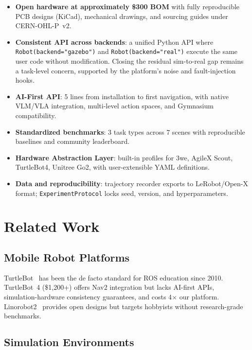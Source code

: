 \documentclass[conference]{IEEEtran}
\begin{document}
\begin{itemize}
    \item \textbf{Open hardware at approximately \$300 BOM} with fully reproducible PCB designs (KiCad), mechanical drawings, and sourcing guides under CERN-OHL-P~v2.
    \item \textbf{Consistent API across backends}: a unified Python API where \texttt{Robot(backend="gazebo")} and \texttt{Robot(backend="real")} execute the same user code without modification. Closing the residual sim-to-real gap remains a task-level concern, supported by the platform's noise and fault-injection hooks.
    \item \textbf{AI-First API}: 5 lines from installation to first navigation, with native VLM/VLA integration, multi-level action spaces, and Gymnasium compatibility.
    \item \textbf{Standardized benchmarks}: 3 task types across 7 scenes with reproducible baselines and community leaderboard.
    \item \textbf{Hardware Abstraction Layer}: built-in profiles for 3we, AgileX Scout, TurtleBot4, Unitree Go2, with user-extensible YAML definitions.
    \item \textbf{Data and reproducibility}: trajectory recorder exports to LeRobot/Open-X format; \texttt{ExperimentProtocol} locks seed, version, and hyperparameters.
\end{itemize}

\section{Related Work}

\subsection{Mobile Robot Platforms}

TurtleBot~\cite{turtlebot} has been the de facto standard for ROS education since 2010. TurtleBot~4 (\$1,200+) offers Nav2 integration but lacks AI-first APIs, simulation-hardware consistency guarantees, and costs 4$\times$ our platform. Linorobot2~\cite{linorobot} provides open designs but targets hobbyists without research-grade benchmarks.

\subsection{Simulation Environments}
\end{document}
